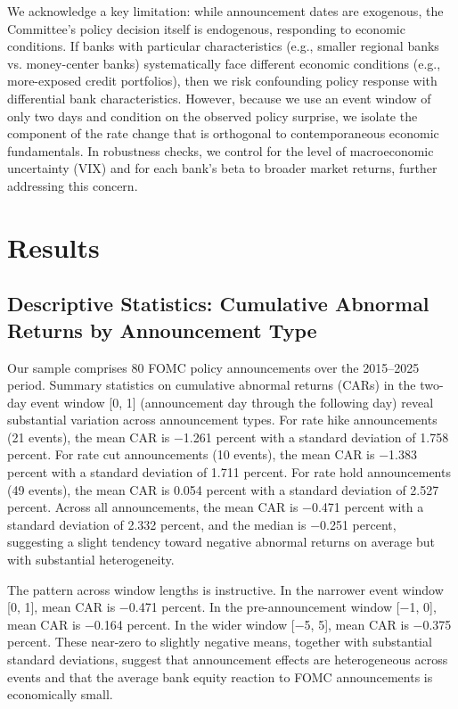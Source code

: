 \documentclass{article}
\begin{document}
We acknowledge a key limitation: while announcement dates are exogenous, the Committee's policy decision itself is endogenous, responding to economic conditions. If banks with particular characteristics (e.g., smaller regional banks vs. money-center banks) systematically face different economic conditions (e.g., more-exposed credit portfolios), then we risk confounding policy response with differential bank characteristics. However, because we use an event window of only two days and condition on the observed policy surprise, we isolate the component of the rate change that is orthogonal to contemporaneous economic fundamentals. In robustness checks, we control for the level of macroeconomic uncertainty (VIX) and for each bank's beta to broader market returns, further addressing this concern.

\section{Results}

\subsection{Descriptive Statistics: Cumulative Abnormal Returns by Announcement Type}

Our sample comprises 80 FOMC policy announcements over the 2015--2025 period. Summary statistics on cumulative abnormal returns (CARs) in the two-day event window [0, 1] (announcement day through the following day) reveal substantial variation across announcement types. For rate hike announcements (21 events), the mean CAR is −1.261 percent with a standard deviation of 1.758 percent. For rate cut announcements (10 events), the mean CAR is −1.383 percent with a standard deviation of 1.711 percent. For rate hold announcements (49 events), the mean CAR is 0.054 percent with a standard deviation of 2.527 percent. Across all announcements, the mean CAR is −0.471 percent with a standard deviation of 2.332 percent, and the median is −0.251 percent, suggesting a slight tendency toward negative abnormal returns on average but with substantial heterogeneity.

The pattern across window lengths is instructive. In the narrower event window [0, 1], mean CAR is −0.471 percent. In the pre-announcement window [−1, 0], mean CAR is −0.164 percent. In the wider window [−5, 5], mean CAR is −0.375 percent. These near-zero to slightly negative means, together with substantial standard deviations, suggest that announcement effects are heterogeneous across events and that the average bank equity reaction to FOMC announcements is economically small.
\end{document}
